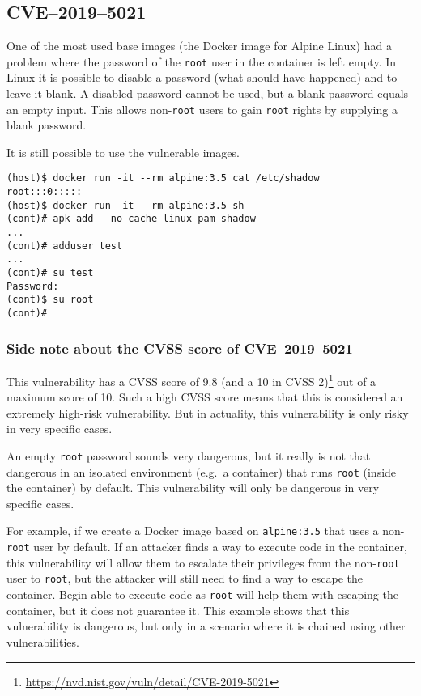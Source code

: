 \subsection{CVE--2019--5021}\label{subsection:CVE-2019-5021}
One of the most used base images (the Docker image for Alpine Linux) had a problem where the password of the \lstinline{root} user in the container is left empty. In Linux it is possible to disable a password (what should have happened) and to leave it blank. A disabled password cannot be used, but a blank password equals an empty input. This allows non-\lstinline{root} users to gain \lstinline{root} rights by supplying a blank password.

\hfill

It is still possible to use the vulnerable images.
\begin{lstlisting}[caption={The Docker image of Alpine Linux 3.5 has an empty password.},captionpos=b]
(host)$ docker run -it --rm alpine:3.5 cat /etc/shadow
root:::0:::::
(host)$ docker run -it --rm alpine:3.5 sh
(cont)# apk add --no-cache linux-pam shadow
...
(cont)# adduser test
...
(cont)# su test
Password:
(cont)$ su root
(cont)#
\end{lstlisting}

\subsubsection*{Side note about the CVSS score of CVE--2019--5021}

This vulnerability has a CVSS score of 9.8 (and a 10 in CVSS 2)\footnote{\url{https://nvd.nist.gov/vuln/detail/CVE-2019-5021}} out of a maximum score of 10. Such a high CVSS score means that this is considered an extremely high-risk vulnerability. But in actuality, this vulnerability is only risky in very specific cases.

An empty \lstinline{root} password sounds very dangerous, but it really is not that dangerous in an isolated environment (e.g.\ a container) that runs \lstinline{root} (inside the container) by default. This vulnerability will only be dangerous in very specific cases.

For example, if we create a Docker image based on \lstinline{alpine:3.5} that uses a non-\lstinline{root} user by default. If an attacker finds a way to execute code in the container, this vulnerability will allow them to escalate their privileges from the non-\lstinline{root} user to \lstinline{root}, but the attacker will still need to find a way to escape the container. Begin able to execute code as \lstinline{root} will help them with escaping the container, but it does not guarantee it. This example shows that this vulnerability is dangerous, but only in a scenario where it is chained using other vulnerabilities.

